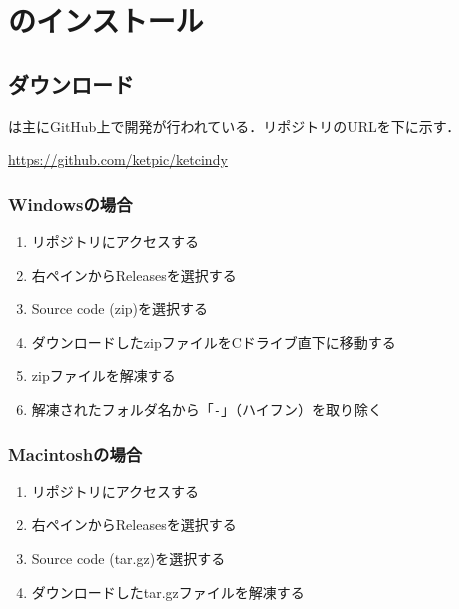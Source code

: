 
\chapter{{\ketcindy}のインストール}

\section{ダウンロード}

{\ketcindy}は主にGitHub上で開発が行われている．リポジトリのURLを下に示す．

\centerline{\url{https://github.com/ketpic/ketcindy}}

\subsection{Windowsの場合}
\begin{enumerate}
    \item リポジトリにアクセスする
    \item 右ペインからReleasesを選択する
    \item Source code (zip)を選択する
    \item ダウンロードしたzipファイルをCドライブ直下に移動する
    \item zipファイルを解凍する
    \item 解凍されたフォルダ名から「\verb|-|」（ハイフン）を取り除く
\end{enumerate}

\subsection{Macintoshの場合}
\begin{enumerate}
    \item リポジトリにアクセスする
    \item 右ペインからReleasesを選択する
    \item Source code (tar.gz)を選択する
    \item ダウンロードしたtar.gzファイルを解凍する
\end{enumerate}

